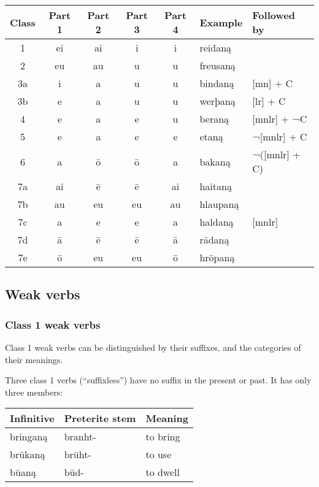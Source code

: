 \documentclass{article}
\newcommand\rec[1]{#1}
\begin{document}
\begin{center}
\begin{tabular}{ | c | c c c c l l |}
\hline
Class & Part 1 & Part 2 & Part 3 & Part 4 & Example & Followed by \\
\hline
1  & ei & ai & i  & i & \rec{reidaną}  & \\
2  & eu & au & u  & u & \rec{freusaną} & \\
3a & i  & a  & u  & u & \rec{bindaną}  & [mn] + C \\
3b & e  & a  & u  & u & \rec{werþaną}  & [lr] + C \\
4  & e  & a  & e  & u & \rec{beraną}   & [mnlr] + ¬C \\
5  & e  & a  & e  & e & \rec{etaną}    & ¬[mnlr] + C \\
6  & a  & ō  & ō  & a & \rec{bakaną}   & ¬([mnlr] + C) \\
\hline
7a & ai & ē    & ē    & ai & haitaną  & \\
7b & au & eu   & eu   & au & hlaupaną & \\
7c & a  & e    & e    & a  & haldaną  & [mnlr] \\
7d & ā  & ē    & ē    & ā  & rādaną   & \\
7e & ō  & eu   & eu   & ō  & hrōpaną  & \\
\hline
\end{tabular}
\end{center}

\subsection{Weak verbs}

\subsubsection{Class 1 weak verbs}

Class 1 weak verbs can be distinguished by their suffixes, and the categories of their meanings.

Three class 1 verbs (``suffixless'') have no suffix in the present or past. It has only three members:

\begin{center}
\begin{tabular}{ | l l l | }
\hline
Infinitive & Preterite stem &  Meaning \\
\hline
bringaną & branht- & to bring \\
brūkaną & brūht- & to use \\
būaną & būd- & to dwell \\
\hline
\end{tabular}
\end{center}
\end{document}
